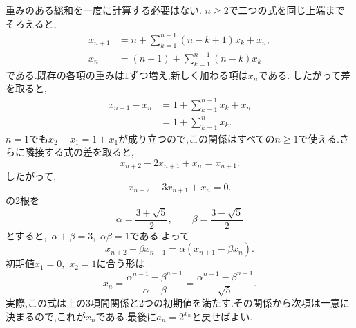 \begin{enumerate}[label=\textbf{問\arabic*.},leftmargin=3.8em,format=\bookitemlink{practice-advanced}{solution}{problem}]
                重みのある総和を一度に計算する必要はない.
                $n\ge2$で二つの式を同じ上端までそろえると,
                \begin{align*}
                  x_{n+1}
                    &=n+\sum_{k=1}^{n-1}(n-k+1)x_k+x_n,\\
                  x_n
                    &=(n-1)+\sum_{k=1}^{n-1}(n-k)x_k
                \end{align*}
                である.既存の各項の重みは$1$ずつ増え,新しく加わる項は$x_n$である.
                したがって差を取ると,
                \begin{align*}
                  x_{n+1}-x_n
                  &=1+\sum_{k=1}^{n-1}x_k+x_n\\
                  &=1+\sum_{k=1}^{n}x_k.
                \end{align*}
                $n=1$でも$x_2-x_1=1+x_1$が成り立つので,この関係はすべての$n\ge1$で使える.さらに隣接する式の差を取ると,
                \[
                  x_{n+2}-2x_{n+1}+x_n=x_{n+1}.
                \]
                したがって,
                \[
                  x_{n+2}-3x_{n+1}+x_n=0.
                \]
                の2根を
                \[
                  \alpha=\frac{3+\sqrt5}{2},\qquad
                  \beta=\frac{3-\sqrt5}{2}
                \]
                とすると,\, $\alpha+\beta=3$,\, $\alpha\beta=1$である.よって
                \[
                  x_{n+2}-\beta x_{n+1}
                   =\alpha(x_{n+1}-\beta x_n).
                \]
                初期値$x_1=0$,\, $x_2=1$に合う形は
                \[
                  x_n
                   =\frac{\alpha^{n-1}-\beta^{n-1}}{\alpha-\beta}
                   =\frac{\alpha^{n-1}-\beta^{n-1}}{\sqrt5}.
                \]
                実際,この式は上の3項間関係と2つの初期値を満たす.その関係から次項は一意に決まるので,これが$x_n$である.最後に$a_n=2^{x_n}$と戻せばよい.


\end{enumerate}
